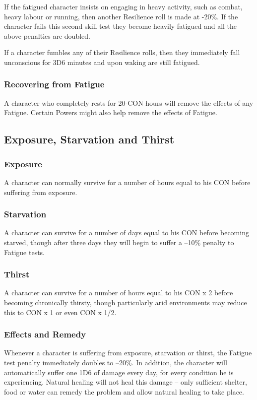 If the fatigued character insists on engaging in heavy activity, such as combat, heavy labour or running, then another Resilience roll is made at -20\%. If the character fails this second skill test they become heavily fatigued and all the above penalties are doubled.

If a character fumbles any of their Resilience rolls, then they immediately fall unconscious for 3D6 minutes and upon waking are still fatigued.

\subsubsection{Recovering from Fatigue}
A character who completely rests for 20-CON hours will remove the effects of any Fatigue. Certain Powers might also help remove the effects of Fatigue.


\subsection{Exposure, Starvation and Thirst}

\subsubsection{Exposure}
A character can normally survive for a number of hours equal to his CON before suffering from exposure. 

\subsubsection{Starvation}
A character can survive for a number of days equal to his CON before becoming starved, though after three days they will begin to suffer a –10\% penalty to Fatigue tests. 

\subsubsection{Thirst}
A character can survive for a number of hours equal to his CON x 2 before becoming chronically thirsty, though particularly arid environments may reduce this to CON x 1 or even CON x 1/2. 

\subsubsection{Effects and Remedy}
Whenever a character is suffering from exposure, starvation or thirst, the Fatigue test penalty immediately doubles to –20\%. In addition, the character will automatically suffer one 1D6 of damage every day, for every condition he is experiencing. Natural healing will not heal this damage – only sufficient shelter, food or water can remedy the problem and allow natural healing to take place. 


